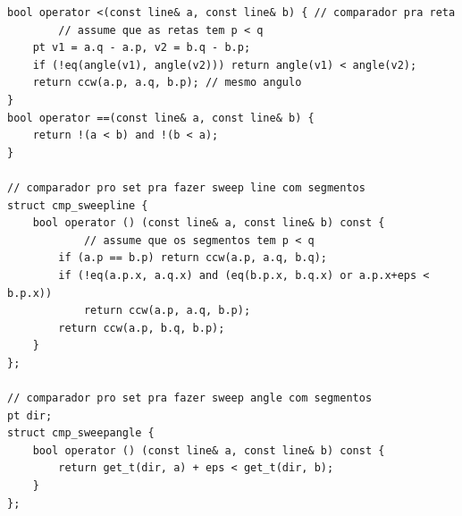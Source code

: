\documentclass[11pt, a4paper, twoside]{article}
\begin{document}
\begin{verbatim}
bool operator <(const line& a, const line& b) { // comparador pra reta
    	// assume que as retas tem p < q
	pt v1 = a.q - a.p, v2 = b.q - b.p;
	if (!eq(angle(v1), angle(v2))) return angle(v1) < angle(v2);
	return ccw(a.p, a.q, b.p); // mesmo angulo
}
bool operator ==(const line& a, const line& b) {
	return !(a < b) and !(b < a);
}

// comparador pro set pra fazer sweep line com segmentos
struct cmp_sweepline {
	bool operator () (const line& a, const line& b) const {
    		// assume que os segmentos tem p < q
		if (a.p == b.p) return ccw(a.p, a.q, b.q);
		if (!eq(a.p.x, a.q.x) and (eq(b.p.x, b.q.x) or a.p.x+eps < b.p.x))
			return ccw(a.p, a.q, b.p);
		return ccw(a.p, b.q, b.p);
	}
};

// comparador pro set pra fazer sweep angle com segmentos
pt dir;
struct cmp_sweepangle {
	bool operator () (const line& a, const line& b) const {
		return get_t(dir, a) + eps < get_t(dir, b);
	}
};
\end{verbatim}
\end{document}
